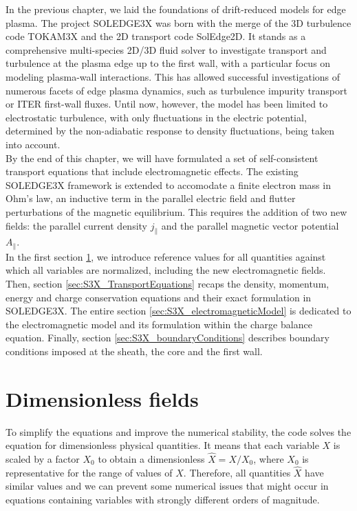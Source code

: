 In the previous chapter, we laid the foundations of drift-reduced models for edge plasma. The project SOLEDGE3X was born with the merge of the 3D turbulence code TOKAM3X\cite{tamain2016tokam3x} and the 2D transport code SolEdge2D\cite{Bufferand_2015}. It stands as a comprehensive multi-species 2D/3D fluid solver to investigate transport and turbulence at the plasma edge up to the first wall, with a particular focus on modeling plasma-wall interactions. This has allowed successful investigations of numerous facets of edge plasma dynamics, such as turbulence\cite{Bufferand_2021} impurity transport\cite{Ciraolo2021} or ITER first-wall fluxes\cite{Rivals2022}. Until now, however, the model has been limited to electrostatic turbulence, with only fluctuations in the electric potential, determined by the non-adiabatic response to density fluctuations, being taken into account. \\

By the end of this chapter, we will have formulated a set of self-consistent transport equations that include electromagnetic effects. The existing SOLEDGE3X framework is extended to accomodate a finite electron mass in Ohm's law, an inductive term in the parallel electric field and flutter perturbations of the magnetic equilibrium. This requires the addition of two new fields: the parallel current density $j_\parallel$ and the parallel magnetic vector potential $A_\parallel$. \\

In the first section \ref{sec:S3X_referenceValues}, we introduce reference values for all quantities against which all variables are normalized, including the new electromagnetic fields. Then, section \ref{sec:S3X_TransportEquations} recaps the density, momentum, energy and charge conservation equations and their exact formulation in SOLEDGE3X. The entire section \ref{sec:S3X_electromagneticModel} is dedicated to the electromagnetic model and its formulation within the charge balance equation. Finally, section \ref{sec:S3X_boundaryConditions} describes boundary conditions imposed at the sheath, the core and the first wall.



\section{Dimensionless fields}
\label{sec:S3X_referenceValues}

To simplify the equations and improve the numerical stability, the code solves the equation for dimensionless physical quantities. It means that each variable $X$ is scaled by a factor $X_0$ to obtain a dimensionless $\hat{X} = X/X_0$, where $X_0$ is representative for the range of values of $X$. Therefore, all quantities $\hat{X}$ have similar values and we can prevent some numerical issues that might occur in equations containing variables with strongly different orders of magnitude. \\

